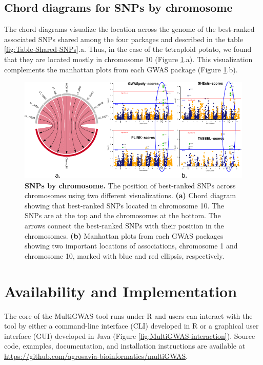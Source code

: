 \documentclass{article}
\begin{document}
\subsection{Chord diagrams for SNPs by chromosome}
The chord diagrams visualize the location across the genome of the best-ranked associated SNPs shared among the four packages and described in the table \ref{fig:Table-Shared-SNPs}.a.  Thus, in the case of the tetraploid potato, we found that they are located mostly in chromosome 10  (Figure \ref{fig:Chord-diagrams}.a). This visualization complements the manhattan plots from each GWAS package (Figure \ref{fig:Chord-diagrams}.b).


\begin{figure}
\begin{centering}
\includegraphics{images/paper-chord-manhattans}
\par\end{centering}
\caption{\textbf{SNPs by chromosome.} The position of best-ranked SNPs across chromosomes using two different visualizations. \textbf{(a)} Chord diagram showing that best-ranked SNPs located in chromosome 10. The SNPs are at the top and the chromosomes at the bottom. The arrows connect the best-ranked SNPs with their position in the chromosomes. \textbf{(b)} Manhattan plots from each GWAS packages showing two important locations of associations, chromosome 1 and chromosome 10, marked with blue and red ellipsis, respectively. \label{fig:Chord-diagrams}}
\end{figure}


\section{Availability and Implementation}

The core of the MultiGWAS tool runs under R and users can interact with the tool by either a command-line interface (CLI) developed in
R or a graphical user interface (GUI) developed in Java (Figure \ref{fig:MultiGWAS-interaction}).
Source code, examples, documentation, and installation instructions are available at \url{https://github.com/agrosavia-bioinformatics/multiGWAS}. 
\end{document}
